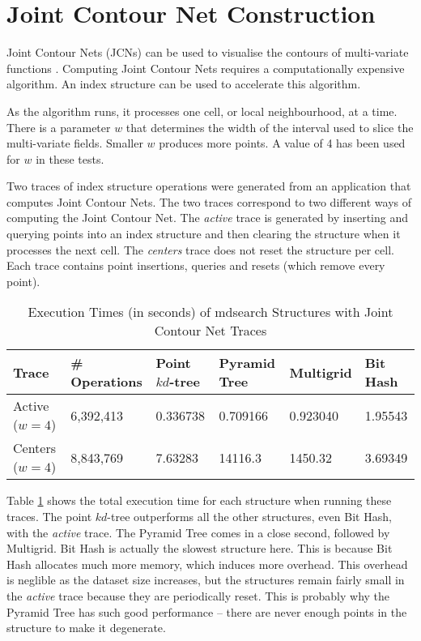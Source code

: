 \section{Joint Contour Net Construction}

Joint Contour Nets (JCNs) can be used to visualise the contours of multi-variate functions \cite{jcn}. Computing Joint Contour Nets requires a computationally expensive algorithm. An index structure can be used to accelerate this algorithm.

As the algorithm runs, it processes one cell, or local neighbourhood, at a time. There is a parameter $w$ that determines the width of the interval used to slice the multi-variate fields. Smaller $w$ produces more points. A value of 4 has been used for $w$ in these tests.

Two traces of index structure operations were generated from an application that computes Joint Contour Nets. The two traces correspond to two different ways of computing the Joint Contour Net. The \textit{active} trace is generated by inserting and querying points into an index structure and then clearing the structure when it processes the next cell. The \textit{centers} trace does not reset the structure per cell. Each trace contains point insertions, queries and resets (which remove every point).

\begin{table}
	\centering
	\begin{tabular}{|l|l|l|l|l|l|}
		\hline
		\textbf{Trace} & \textbf{\# Operations} & Point $kd$-tree & Pyramid Tree & Multigrid & Bit Hash \\
		\hline
		Active ($w = 4$) & 6,392,413 & 0.336738 & 0.709166 & 0.923040 & 1.95543 \\
		Centers ($w = 4$) & 8,843,769 & 7.63283 & 14116.3 & 1450.32 & 3.69349 \\
		\hline
	\end{tabular}

	\caption{Execution Times (in seconds) of mdsearch Structures with Joint Contour Net Traces}
	\label{tab:jcn-trace-times}
\end{table}

Table \ref{tab:jcn-trace-times} shows the total execution time for each structure when running these traces. The point $kd$-tree outperforms all the other structures, even Bit Hash, with the \textit{active} trace. The Pyramid Tree comes in a close second, followed by Multigrid. Bit Hash is actually the slowest structure here. This is because Bit Hash allocates much more memory, which induces more overhead. This overhead is neglible as the dataset size increases, but the structures remain fairly small in the \textit{active} trace because they are periodically reset. This is probably why the Pyramid Tree has such good performance -- there are never enough points in the structure to make it degenerate.

